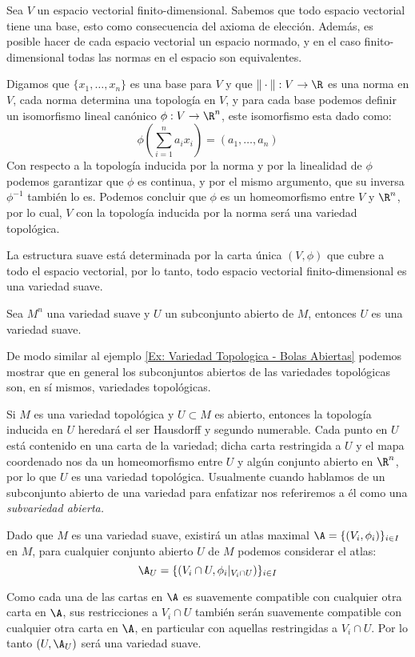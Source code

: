 \begin{example}\label{Ex: Variedad Sauve - Espacios Vectoriales}
  Sea $V$ un espacio vectorial finito-dimensional. Sabemos que todo espacio vectorial tiene una base, esto como consecuencia del axioma de elección. Además, es posible hacer de cada espacio vectorial un espacio normado, y en el caso finito-dimensional todas las normas en el espacio son equivalentes.

  Digamos que $\{x_1, \ldots, x_n\}$ es una base para $V$ y que $\| \cdot \|: V \to \R$ es una norma en $V$, cada norma determina una topología en $V$, y para cada base podemos definir un isomorfismo lineal canónico $\phi: V \to \R^n$, este isomorfismo esta dado como:
  \[
    \phi\left( \sum_{i=1}^{n} a_i x_i\right) = (a_1, \ldots, a_n)
  \]
  Con respecto a la topología inducida por la norma y por la linealidad de $\phi$ podemos garantizar que $\phi$ es continua, y por el mismo argumento, que su inversa $\phi^{-1}$ también lo es. Podemos concluir que $\phi$ es un homeomorfismo entre $V$ y $\R^n$, por lo cual, $V$ con la topología inducida por la norma será una variedad topológica.

  La estructura suave está determinada por la carta única $(V, \phi)$ que cubre a todo el espacio vectorial, por lo tanto, todo espacio vectorial finito-dimensional es una variedad suave.
\end{example}

\begin{example}\label{Ex: Variedad Suave - Subvariedades Suaves}
	Sea $M^n$ una variedad suave y $U$ un subconjunto abierto de $M$, entonces $U$ es una variedad suave.

	De modo similar al ejemplo \ref{Ex: Variedad Topologica - Bolas Abiertas} podemos mostrar que en general los subconjuntos abiertos de las variedades topológicas son, en sí mismos, variedades topológicas.

	Si $M$ es una variedad topológica y $U \subset M$ es abierto, entonces la topología inducida en $U$ heredará el ser Hausdorff y segundo numerable. Cada punto en $U$ está contenido en una carta de la variedad; dicha carta restringida a $U$ y el mapa coordenado nos da un homeomorfismo entre $U$ y algún conjunto abierto en $\R^n$, por lo que $U$ es una variedad topológica. Usualmente cuando hablamos de un subconjunto abierto de una variedad para enfatizar nos referiremos a él como una \it{subvariedad abierta}.

	Dado que $M$ es una variedad suave, existirá un atlas maximal $\A = \{(V_i,\phi_i) \}_{i \in I}$ en $M$, para cualquier conjunto abierto $U$ de $M$ podemos considerar el atlas:
	\[ \A_U = \{(V_i \cap U, \phi_i |_{V_i \cap U})\}_{i \in I} \]

	Como cada una de las cartas en $\A$ es suavemente compatible con cualquier otra carta en $\A$, sus restricciones a $V_i \cap U$ también serán suavemente compatible con cualquier otra carta en $\A$, en particular con aquellas restringidas a $V_i \cap U$. Por lo tanto $(U, \A_U)$ será una variedad suave.
\end{example}

